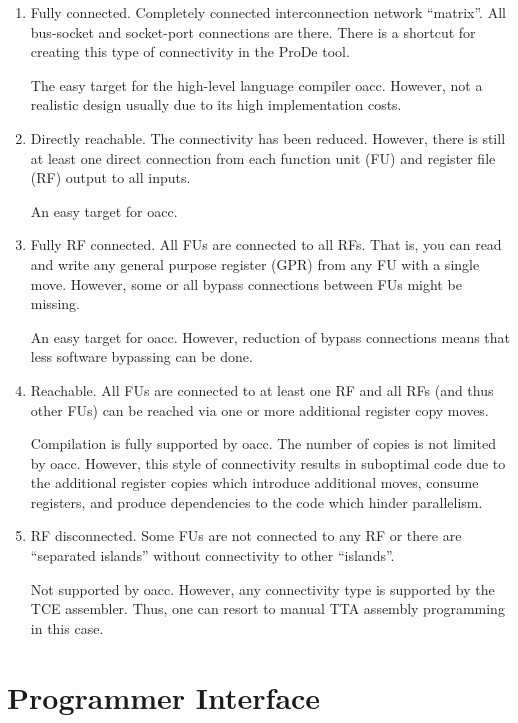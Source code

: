 \documentclass[a4paper,twoside]{tceusermanual}
\begin{document}
\begin{enumerate}

\item Fully connected. Completely connected interconnection network ``matrix''.
All bus-socket and socket-port connections are there. There is a shortcut for
creating this type of connectivity in the ProDe tool.

The easy target for the high-level language compiler oacc. However, not
a realistic design usually due to its high implementation costs.

\item Directly reachable. The connectivity has been reduced. However, there is
still at least one direct connection from each function unit (FU) and register file 
(RF) output to all inputs.

An easy target for oacc.

\item Fully RF connected. All FUs are connected to all RFs. That is, you can 
read and write any general purpose register (GPR) from any FU with a single
move. However, some or all bypass connections between FUs might be missing.

An easy target for oacc. However, reduction of bypass connections means
that less software bypassing can be done.

\item Reachable. All FUs are connected to at least one RF and all RFs (and thus
other FUs) can be reached via one or more additional register copy moves. 

Compilation is fully supported by oacc. The number of copies is not 
limited by oacc. However, this style of connectivity results in suboptimal code due to the
additional register copies which introduce additional moves, consume registers, and
produce dependencies to the code which hinder parallelism.

\item RF disconnected. Some FUs are not connected to any RF or there are 
``separated islands'' without connectivity to other ``islands''.

Not supported by oacc. However, any connectivity type is supported by 
the TCE assembler. Thus, one can resort to manual TTA assembly programming in
this case.

\end{enumerate}

\section{Programmer Interface}
\end{document}
